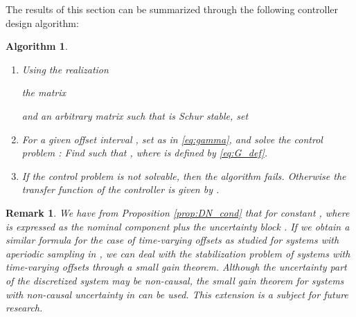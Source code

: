 \documentclass[letterpaper, 12pt, draftcls, onecolumn]{ieeeconf}
\newtheorem{remark}[theorem]{Remark}
\newtheorem{algorithm}[theorem]{Algorithm}
\begin{document}
The results of this section can be summarized through the following controller design algorithm:
\begin{algorithm}
	\label{alg:controller_design}
	\begin{enumerate}
		\item
		Using the realization 
		
		the matrix 
		
and an arbitrary matrix  such that  is Schur stable,
		set
		
		
		\item 
		For a given offset interval ,
		set  as in \eqref{eq:gamma}, and
		solve the  control problem \cite[Chaps.~16,~17]{zhou1996}:
		Find  such that 
		,
		where  is defined by \eqref{eq:G_def}.
		
		
		\item 
		If the  control problem is not solvable,
		then the algorithm fails.
		Otherwise the transfer function  of the 
		controller 
		is given by .
	\end{enumerate}
\end{algorithm}



\begin{remark}
		We have from Proposition \ref{prop:DN_cond}
		that  for constant , where
		 is expressed as the nominal component  
		plus the uncertainty block .
		If we obtain a similar formula for the case of time-varying offsets as
		studied for systems with aperiodic sampling in \cite{Fujioka2009},
		we can deal with the stabilization problem of systems with time-varying offsets
		through a small gain theorem. Although
		the uncertainty part of the discretized system  may be non-causal, 
		the small gain theorem for systems with non-causal uncertainty in \cite{Unal2008Automatica}
		can be used.
		This extension is a subject for future research.
\end{remark}
\end{document}
